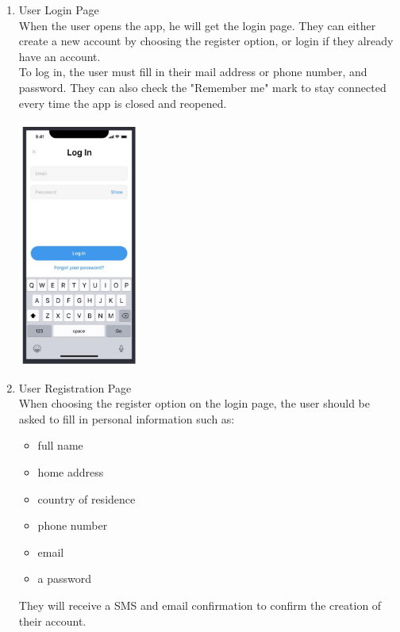 \documentclass[10pt]{article}
\begin{document}
\begin{multicols*}{2}
\begin{enumerate}
  \item {User Login Page} \\
  When the user opens the app, he will get the login page. They can either create a new account by choosing the register option, or login if they already have an account. \\
  To log in, the user must fill in their mail address or phone number, and password. They can also check the "Remember me" mark to stay connected every time the app is closed and reopened. \\
  \begin{center}
    \includegraphics[max width=4cm]{pages/login.jpg}
  \end{center}

  \item {User Registration Page} \\
  When choosing the register option on the login page, the user should be asked to fill in personal information such as:
  \begin{itemize}
    \item full name
    \item home address
    \item country of residence
    \item phone number
    \item email
    \item a password
  \end{itemize}
  They will receive a SMS and email confirmation to confirm the creation of their account.
  

\end{enumerate}
\end{multicols*}
\end{document}
